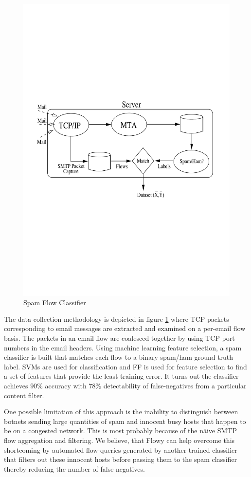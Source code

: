 \begin{figure}[h!]
\begin{center}
  \includegraphics* [width=0.7\linewidth]{figures/email-flow}	
  \caption{Spam Flow Classifier \cite{rbeverly:2008}}
  \label{fig:email-flow}
\end{center}
\end{figure}
The data collection methodology is depicted in figure \ref{fig:email-flow} where \ac{TCP} packets corresponding to email messages are extracted and examined on a per-email flow basis. The packets in an email flow are coalesced together by using \ac{TCP} port numbers in the email headers. Using machine learning feature selection,  a spam classifier is built that matches each flow to a binary spam/ham ground-truth label. \ac{SVMs} \cite{vvapnik:1995} are used for classification and \ac{FF} \cite{yyang:1997} is used for feature selection to find a set of features that provide the least training error. It turns out the classifier achieves $90\%$ accuracy with $78\%$ detectability of false-negatives from a particular content filter. 

One possible limitation of this approach is the inability to distinguish between botnets sending large quantities of spam and innocent busy hosts that happen to be on a congested network. This is most probably because of the   n\"aive \ac{SMTP} flow aggregation and filtering. We believe, that Flowy can help overcome this  shortcoming by automated flow-queries generated by another trained classifier that filters out these innocent hosts before passing them to the spam classifier thereby reducing the number of false negatives.

